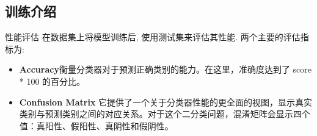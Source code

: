 \documentclass{beamer}
\begin{document}
\subsection{训练介绍}
\begin{frame}[fragile]{性能评估}
	在数据集上将模型训练后, 使用测试集来评估其性能. 两个主要的评估指标为:
	\begin{itemize}
		\item \textbf{Accuracy}衡量分类器对于预测正确类别的能力。在这里，准确度达到了 score * 100 的百分比。

		\item \textbf{Confusion Matrix} 它提供了一个关于分类器性能的更全面的视图，显示真实类别与预测类别之间的对应关系。对于这个二分类问题，混淆矩阵会显示四个值：真阳性、假阳性、真阴性和假阴性。
	\end{itemize}
\end{frame}
\end{document}
